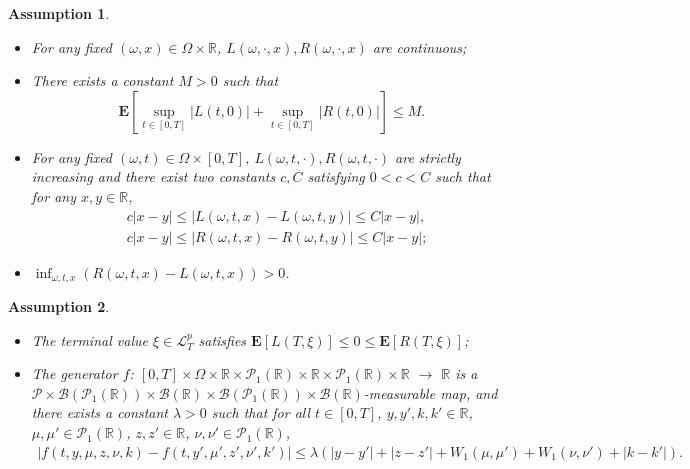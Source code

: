 \documentclass[10pt,a4paper]{amsart}
\newtheorem{assumption}{Assumption}
\begin{document}
\begin{assumption}\label{assLR}
\begin{itemize}
\item[(1)] For any fixed $(\omega,x)\in \Omega\times\mathbb{R}$, $L(\omega, \cdot, x), R(\omega, \cdot, x)$ are continuous;%
\item[(2)]  There exists a constant $M>0$ such that $$\mathbf{E}\left[\sup_{t\in[0,T]}\left|L(t,0)\right|+\sup_{t\in[0,T]}\left|R(t,0)\right|\right]\leq M.$$
\item[(3)] For any fixed $(\omega,t)\in \Omega\times [0,T]$, $L(\omega,t,\cdot),R(\omega,t,\cdot)$ are strictly increasing and there  exist two constants $c,C$ satisfying $0<c<C$ such that for any $x,y\in \mathbb{R}$,
\begin{align*}
&c\left|x-y\right|\leq \left|L(\omega,t,x)-L(\omega,t,y)\right|\leq C\left|x-y\right|,\\
&c\left|x-y\right|\leq \left|R(\omega,t,x)-R(\omega,t,y)\right|\leq C\left|x-y\right|;
\end{align*}
\item[(4)] $\inf_{\omega,t,x} \left(R(\omega,t,x)-L(\omega,t,x)\right)>0$.
\end{itemize}
\end{assumption}

\begin{assumption}\label{ass1ipterminalp}
\begin{itemize}
      \item[(i)]  The terminal value $\xi \in \mathcal{L}^{p}_T $ satisfies $\mathbf{E}[L(T,\xi)]\leq 0 \leq \mathbf{E}[R(T,\xi)]$; 
      \item[(ii)] The generator $f$: $[0,T]\times\Omega\times \mathbb{R}\times \mathcal{P}_1(\mathbb{R})\times\mathbb{R}\times \mathcal{P}_1(\mathbb{R})\times \mathbb{R}$ $\rightarrow$ $\mathbb{R}$ is a $\mathcal{P}\times\mathcal{B}(\mathcal{P}_1(\mathbb{R}))\times\mathcal{B}(\mathbb{R})\times\mathcal{B}(\mathcal{P}_1(\mathbb{R}))\times\mathcal{B}(\mathbb{R})$-measurable map, and there exists a constant $\lambda>0$ such that for all $t\in[0,T]$, $y, y', k, k' \in \mathbb{R}$, $\mu, \mu' \in \mathcal{P}_1(\mathbb{R})$, $z, z'\in \mathbb{R}$, $\nu, \nu'\in\mathcal{P}_1(\mathbb{R})$, 
\begin{align*}
\left|f(t,y,\mu,z,\nu,k)-f(t,y',\mu',z',\nu',k')\right|\leq \lambda\left(\left|y-y'\right|+\left|z-z'\right|+W_1(\mu,\mu')+W_1(\nu,\nu')+\left|k-k'\right|\right).
\end{align*}
   \end{itemize}
\end{assumption}
\end{document}
